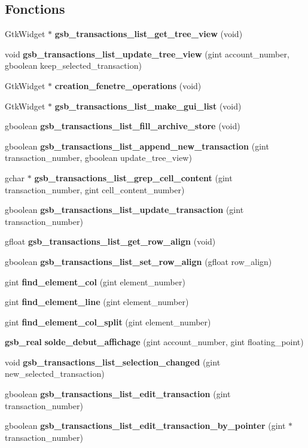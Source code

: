 \subsection*{Fonctions}
\begin{DoxyCompactItemize}
\item 
GtkWidget $\ast$ {\bf gsb\_\-transactions\_\-list\_\-get\_\-tree\_\-view} (void)
\item 
void {\bf gsb\_\-transactions\_\-list\_\-update\_\-tree\_\-view} (gint account\_\-number, gboolean keep\_\-selected\_\-transaction)
\item 
GtkWidget $\ast$ {\bf creation\_\-fenetre\_\-operations} (void)
\item 
GtkWidget $\ast$ {\bf gsb\_\-transactions\_\-list\_\-make\_\-gui\_\-list} (void)
\item 
gboolean {\bf gsb\_\-transactions\_\-list\_\-fill\_\-archive\_\-store} (void)
\item 
gboolean {\bf gsb\_\-transactions\_\-list\_\-append\_\-new\_\-transaction} (gint transaction\_\-number, gboolean update\_\-tree\_\-view)
\item 
gchar $\ast$ {\bf gsb\_\-transactions\_\-list\_\-grep\_\-cell\_\-content} (gint transaction\_\-number, gint cell\_\-content\_\-number)
\item 
gboolean {\bf gsb\_\-transactions\_\-list\_\-update\_\-transaction} (gint transaction\_\-number)
\item 
gfloat {\bf gsb\_\-transactions\_\-list\_\-get\_\-row\_\-align} (void)
\item 
gboolean {\bf gsb\_\-transactions\_\-list\_\-set\_\-row\_\-align} (gfloat row\_\-align)
\item 
gint {\bf find\_\-element\_\-col} (gint element\_\-number)
\item 
gint {\bf find\_\-element\_\-line} (gint element\_\-number)
\item 
gint {\bf find\_\-element\_\-col\_\-split} (gint element\_\-number)
\item 
{\bf gsb\_\-real} {\bf solde\_\-debut\_\-affichage} (gint account\_\-number, gint floating\_\-point)
\item 
void {\bf gsb\_\-transactions\_\-list\_\-selection\_\-changed} (gint new\_\-selected\_\-transaction)
\item 
gboolean {\bf gsb\_\-transactions\_\-list\_\-edit\_\-transaction} (gint transaction\_\-number)
\item 
gboolean {\bf gsb\_\-transactions\_\-list\_\-edit\_\-transaction\_\-by\_\-pointer} (gint $\ast$transaction\_\-number)

\end{DoxyCompactItemize}
